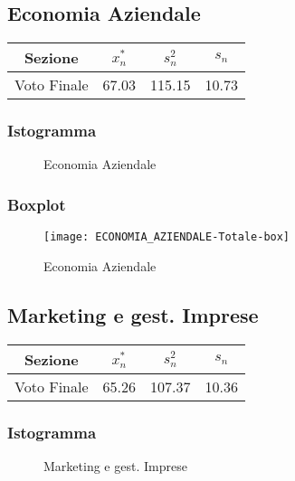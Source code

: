 \thispagestyle{empty} %
\subsection{Economia Aziendale}

\begin{center}
\begin{tabular}{|c|c|c|c|}
  \hline
  Sezione & \(x_{n}^{*}\) & \(s_n^2\) & \(s_n\) \\
  \hline
  Voto Finale & 67.03 & 115.15 & 10.73 \\
  \hline
\end{tabular}
\end{center}

\subsubsection{Istogramma}
\begin{figure}[!h]
  \caption{Economia Aziendale}
\end{figure}

\subsubsection{Boxplot}
\begin{figure}[!h]
  \centering
  \texttt{[image: ECONOMIA\_AZIENDALE-Totale-box]}
  \caption{Economia Aziendale}
\end{figure}
\restoregeometry
\clearpage

\thispagestyle{empty} %
\subsection{Marketing e gest. Imprese}

\begin{center}
\begin{tabular}{|c|c|c|c|}
  \hline
  Sezione & \(x_{n}^{*}\) & \(s_n^2\) & \(s_n\) \\
  \hline
  Voto Finale & 65.26 & 107.37 & 10.36 \\
  \hline
\end{tabular}
\end{center}

\subsubsection{Istogramma}
\begin{figure}[!h]
  \caption{Marketing e gest. Imprese}
\end{figure}

